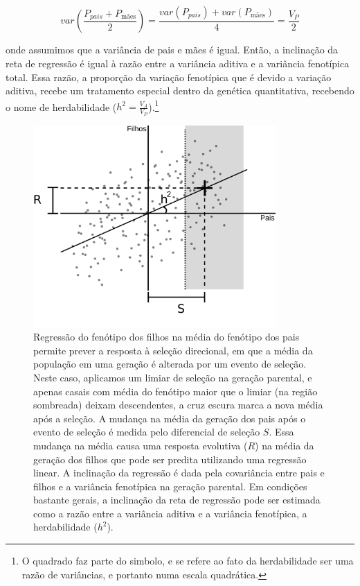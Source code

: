 \begin{refsection}
\begin{equation}
var(\frac{P_{pais} + P_{\text{mães}}}{2}) = \frac{var(P_{pais}) + var(P_{\text{mães}})}{4} = \frac{V_P}{2}
\end{equation}

onde assumimos que a variância de pais e mães é igual. Então, a inclinação da
reta de regressão é igual à razão entre a variância aditiva e a variância
fenotípica total. Essa razão, a proporção da variação fenotípica que é devido
a variação aditiva, recebe um tratamento especial dentro da genética
quantitativa, recebendo o nome de herdabilidade ($h^2 =
\frac{V_A}{V_P}$).\footnote{O quadrado faz parte do simbolo, e se refere ao
fato da herdabilidade ser uma razão de variâncias, e portanto numa escala
quadrática.}

\begin{figure}
    \centering
    \includegraphics[width=350px]{parent-offspring.png}
    \caption[Regressão pais e filhos]{Regressão do fenótipo dos filhos na média 
    do fenótipo dos pais permite prever a resposta à seleção direcional, em
    que a média da população em uma geração é alterada por um evento de
    seleção. Neste caso, aplicamos um limiar de seleção na geração parental, e
    apenas casais com média do fenótipo maior que o limiar (na região
    sombreada) deixam descendentes, a cruz escura marca a nova média após a
    seleção. A mudança na média da geração dos pais após o evento de seleção é
    medida pelo diferencial de seleção $S$. Essa mudança na média causa uma
    resposta evolutiva ($R$) na média da geração dos filhos que pode ser
    predita utilizando uma regressão linear. A inclinação da regressão é dada
    pela covariância entre pais e filhos e a variância fenotípica na geração
    parental. Em condições bastante gerais, a inclinação da reta de regressão pode ser 
    estimada como a razão entre a variância aditiva e a variância fenotípica, a
    herdabilidade ($h^2$).}
    \label{PoR}
\end{figure}


\end{refsection}
